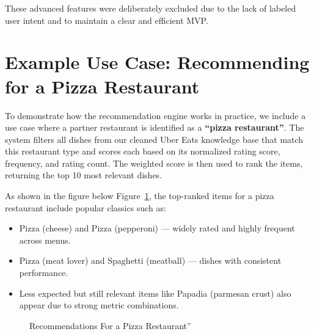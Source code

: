\documentclass[
  11pt,
  a4paper,
  DIV=11,
  numbers=noendperiod]{scrartcl}
\providecommand{\tightlist}{%
  \setlength{\itemsep}{0pt}\setlength{\parskip}{0pt}}\usepackage{longtable,booktabs,array}
\begin{document}
These advanced features were deliberately excluded due to the lack of
labeled user intent and to maintain a clear and efficient MVP.

\section{Example Use Case: Recommending for a Pizza
Restaurant}\label{example-use-case-recommending-for-a-pizza-restaurant}

To demonstrate how the recommendation engine works in practice, we
include a use case where a partner restaurant is identified as a
\textbf{``pizza restaurant''}. The system filters all dishes from our
cleaned Uber Eats knowledge base that match this restaurant type and
scores each based on its normalized rating score, frequency, and rating
count. The weighted score is then used to rank the items, returning the
top 10 most relevant dishes.

As shown in the figure below Figure~\ref{fig-rec-example}, the
top-ranked items for a pizza restaurant include popular classics such
as:

\begin{itemize}
\tightlist
\item
  Pizza (cheese) and Pizza (pepperoni) --- widely rated and highly
  frequent across menus.
\item
  Pizza (meat lover) and Spaghetti (meatball) --- dishes with consistent
  performance.
\item
  Less expected but still relevant items like Papadia (parmesan crust)
  also appear due to strong metric combinations.
\end{itemize}

\begin{figure}

\caption{\label{fig-rec-example}Recommendations For a Pizza
Restaurant''}


\end{figure}%
\end{document}
